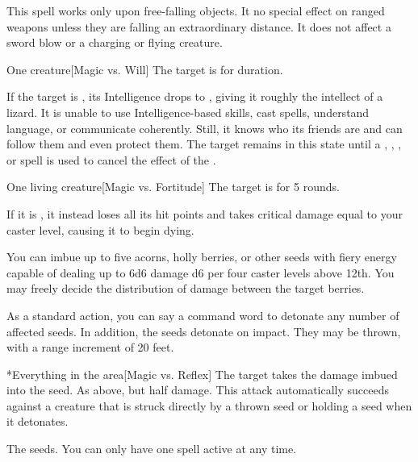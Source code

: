 This spell works only upon free-falling objects. It no special effect on ranged weapons unless they are falling an extraordinary distance. It does not affect a sword blow or a charging or flying creature.

\spellrng{\rngclose}
\begin{spelltarget}{One creature}[Magic vs. Will]
    \spellsuccess The target is \bewildered for \durshort duration.

    If the target is \bloodied, its Intelligence drops to , giving it roughly the intellect of a lizard. It is unable to use Intelligence-based skills, cast spells, understand language, or communicate coherently. Still, it knows who its friends are and can follow them and even protect them. The target remains in this state until a , , , or  spell is used to cancel the effect of the .
\end{spelltarget}

\spellrng{\rngclose}
\begin{spelltarget}{One living creature}[Magic vs. Fortitude]
    \spellsuccess The target is \staggered for 5 rounds.

    If it is \bloodied, it instead loses all its hit points and takes critical damage equal to your caster level, causing it to begin dying.
\end{spelltarget}

\spellline
\spelleffect You can imbue up to five acorns, holly berries, or other seeds with fiery energy capable of dealing up to 6d6 damage \add d6 per four caster levels above 12th. You may freely decide the distribution of damage between the target berries.

As a standard action, you can say a command word to detonate any number of affected seeds. In addition, the seeds detonate on impact. They may be thrown, with a range increment of 20 feet.
\begin{spelltarget}*{Everything in the area}[Magic vs. Reflex]
    \spellsuccess The target takes the damage imbued into the seed.
    \spellfailure As above, but half damage.
    \spellspecial This attack automatically succeeds against a creature that is struck directly by a thrown seed or holding a seed when it detonates.
\end{spelltarget}
 The seeds.
\spellnotes You can only have one  spell active at any time.

